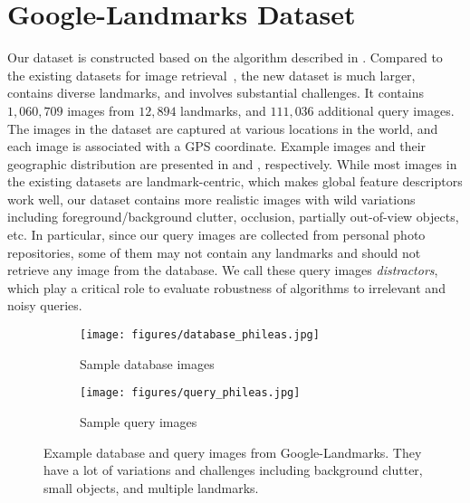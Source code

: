 \documentclass[10pt,twocolumn,letterpaper]{article}
\begin{document}
 

\section{Google-Landmarks Dataset}

Our dataset is constructed based on the algorithm described in \cite{zheng2009tour}.
Compared to the existing datasets for image retrieval~\cite{Philbin07,Philbin2008,Jegou2008}, the new dataset is much larger, contains diverse landmarks, and involves substantial challenges.
It contains $1,060,709$ images from $12,894$ landmarks, and $111,036$ additional query images.
The images in the dataset are captured at various locations in the world, and each image is associated with a GPS coordinate. 
Example images and their geographic distribution are presented in  and , respectively.
While most images in the existing datasets are landmark-centric, which makes global feature descriptors work well, our dataset contains more realistic images with wild variations including foreground/background clutter, occlusion, partially out-of-view objects, etc.
In particular, since our query images are collected from personal photo repositories, some of them may not contain any landmarks and should not retrieve any image from the database.
We call these query images {\em distractors}, which play a critical role to evaluate robustness of algorithms to irrelevant and noisy queries.
\begin{figure}[t]
\vspace{3pt}
\begin{center}
\begin{subfigure}{1\linewidth}
   \texttt{[image: figures/database\_phileas.jpg]} \vspace{-14pt}
   \caption{\footnotesize Sample database images} \vspace{1pt}
\end{subfigure}
\begin{subfigure}{1\linewidth}
   \texttt{[image: figures/query\_phileas.jpg]} \vspace{-14pt}
   \caption{\footnotesize Sample query images} \vspace{1pt}
\end{subfigure}
\vspace{-8pt}          
\caption{Example database and query images from Google-Landmarks. They have a lot of variations and challenges including background clutter, small objects, and multiple landmarks.}
\vspace{-8pt}          
\label{fig:examples}                                                                                                                                                                                                 
\end{center}
\end{figure}
\end{document}
